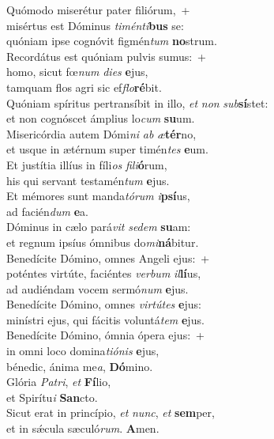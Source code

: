 \oddverse Quómodo miserétur pater filiórum,~+\\
\oddverse  misértus est Dóminus \textit{ti}\textit{mén}\textit{ti}\textbf{bus} se:~\*\\
\oddverse quóniam ipse cognóvit figmén\textit{tum} \textbf{no}strum.\\
\evenverse Recordátus est quóniam pulvis sumus:~+\\
\evenverse  homo, sicut fœ\textit{num} \textit{di}\textit{es} \textbf{e}jus,~\*\\
\evenverse tamquam flos agri sic ef\textit{flo}\textbf{ré}bit.\\
\oddverse Quóniam spíritus pertransíbit in illo, \textit{et} \textit{non} \textit{sub}\textbf{sí}stet:~\*\\
\oddverse et non cognóscet ámplius lo\textit{cum} \textbf{su}um.\\
\evenverse Misericórdia autem Dómi\textit{ni} \textit{ab} \textit{æ}\textbf{tér}no,~\*\\
\evenverse et usque in ætérnum super timén\textit{tes} \textbf{e}um.\\
\oddverse Et justítia illíus in fíli\textit{os} \textit{fi}\textit{li}\textbf{ó}rum,~\*\\
\oddverse his qui servant testamén\textit{tum} \textbf{e}jus.\\
\evenverse Et mémores sunt manda\textit{tó}\textit{rum} \textit{i}\textbf{psí}us,~\*\\
\evenverse ad facién\textit{dum} \textbf{e}a.\\
\oddverse Dóminus in cælo pará\textit{vit} \textit{se}\textit{dem} \textbf{su}am:~\*\\
\oddverse et regnum ipsíus ómnibus do\textit{mi}\textbf{ná}bitur.\\
\evenverse Benedícite Dómino, omnes Angeli ejus:~+\\
\evenverse  poténtes virtúte, faciéntes \textit{ver}\textit{bum} \textit{il}\textbf{lí}us,~\*\\
\evenverse ad audiéndam vocem sermó\textit{num} \textbf{e}jus.\\
\oddverse Benedícite Dómino, omnes \textit{vir}\textit{tú}\textit{tes} \textbf{e}jus:~\*\\
\oddverse minístri ejus, qui fácitis voluntá\textit{tem} \textbf{e}jus.\\
\evenverse Benedícite Dómino, ómnia ópera ejus:~+\\
\evenverse  in omni loco domina\textit{ti}\textit{ó}\textit{nis} \textbf{e}jus,~\*\\
\evenverse bénedic, ánima me\textit{a}, \textbf{Dó}mino.\\
\oddverse Glória \textit{Pa}\textit{tri}, \textit{et} \textbf{Fí}lio,~\*\\
\oddverse et Spirítu\textit{i} \textbf{San}cto.\\
\evenverse Sicut erat in princípio, \textit{et} \textit{nunc}, \textit{et} \textbf{sem}per,~\*\\
\evenverse et in sǽcula sæculó\textit{rum}. \textbf{A}men.\\
